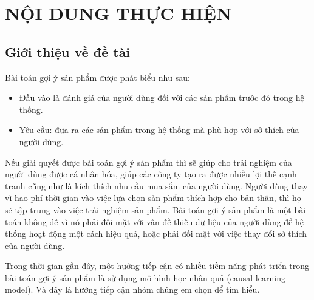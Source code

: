 \documentclass{article}[14pt]
\begin{document}
    \section{NỘI DUNG THỰC HIỆN}
    {

    
    \subsection{Giới thiệu về đề tài}
    
    Bài toán gợi ý sản phẩm được phát biểu như sau:
    \begin{itemize}
        \item Đầu vào là đánh giá của người dùng đối với các sản phẩm trước đó trong hệ thống.
        \item Yêu cầu: đưa ra các sản phẩm trong hệ thống mà phù hợp với sở thích của người dùng.
    \end{itemize}
    Nếu giải quyết được bài toán gợi ý sản phẩm thì sẽ giúp cho trải nghiệm của người dùng được cá nhân hóa, giúp các công ty tạo ra được nhiều lợi thế cạnh tranh cũng như là kích thích nhu cầu mua sắm của người dùng. Người dùng thay vì hao phí thời gian vào việc lựa chọn sản phẩm thích hợp cho bản thân, thì họ sẽ tập trung vào việc trải nghiệm sản phẩm. Bài toán gợi ý sản phẩm là một bài toán không dễ vì nó phải đối mặt với vấn đề thiếu dữ liệu của người dùng để hệ thống hoạt động một cách hiệu quả, hoặc phải đối mặt với việc thay đổi sở thích của người dùng.
    
    Trong thời gian gần đây, một hướng tiếp cận có nhiều tiềm năng phát triển trong bài toán gợi ý sản phẩm là sử dụng mô hình học nhân quả (causal learning model). Và đây là hướng tiếp cận nhóm chúng em chọn để tìm hiểu.
}
\end{document}
